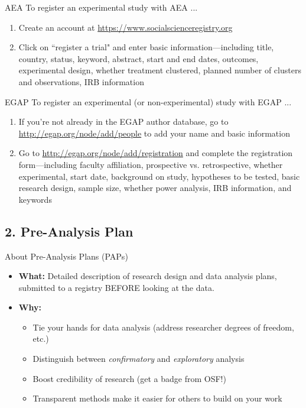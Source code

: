 \documentclass[12pt, compress, handout]{beamer}
\let\noteitem\item %
\renewcommand{\item}{ 
	\noteitem\vspace{\fill}
	}
\begin{document}
	\begin{frame}{AEA}
		To register an experimental study with AEA ...
		
		\pause
		\begin{enumerate}
			\item Create an account at \url{https://www.socialscienceregistry.org}
			\item Click on ``register a trial" and enter basic information---including title, country, status, keyword, abstract, start and end dates, outcomes, experimental design, whether treatment clustered, planned number of clusters and observations, IRB information
		\end{enumerate}
	\end{frame}	
		
	\begin{frame}{EGAP}
		To register an experimental (or non-experimental) study with EGAP ... 
		
		\pause
		\begin{enumerate}
			\item If you're not already in the EGAP author database, go to \url{http://egap.org/node/add/people} to add your name and basic information 
			\item Go to \url{http://egap.org/node/add/registration} and complete the registration form---including faculty affiliation, prospective vs. retrospective, whether experimental, start date, background on study, hypotheses to be tested, basic research design, sample size, whether power analysis, IRB information, and keywords
		\end{enumerate}
	\end{frame}	

	
\subsection{2. Pre-Analysis Plan}

	\begin{frame}{About Pre-Analysis Plans (PAPs)}
		\begin{itemize}
			\item \textbf{What:} Detailed description of research design and data analysis plans, submitted to a registry BEFORE looking at the data.
			\item \textbf{Why:} 
				\begin{itemize}
				 	\item Tie your hands for data analysis (address researcher degrees of freedom, etc.)
				 	\item Distinguish between \textit{confirmatory} and \textit{exploratory} analysis
				 	\item Boost credibility of research (get a badge from OSF!)
				 	\item Transparent methods make it easier for others to build on your work
				\end{itemize}
		\end{itemize}
	\end{frame}
	
\end{document}

